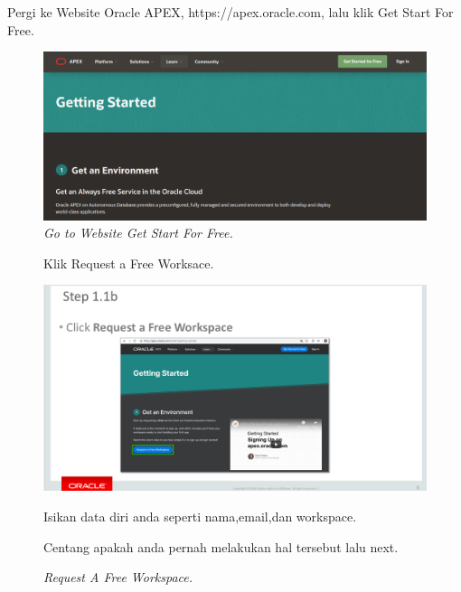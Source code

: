 \begin{enumerate}
\item[1]Pergi ke Website Oracle APEX, https://apex.oracle.com, lalu klik Get Start For Free.

\begin{figure}[!htbp]

    \begin{center}
        \includegraphics[scale=0.2]{figures/TampilanAracleApex.png}
        \caption{\textit{Go to Website Get Start For Free.}}
        \end{center}   
        \end{figure}
        \begin{figure}[!htbp]
\item[2]Klik Request a Free Worksace.

    \begin{center}
    \includegraphics[scale=0.2]{figures/step1.png}
    \caption{\textit{Request A Free Workspace.}}
    \end{center}

\item[3]Isikan data diri anda seperti nama,email,dan workspace.

        
\item[4]Centang apakah anda pernah melakukan hal tersebut lalu next.  


\end{figure}
\end{enumerate}
